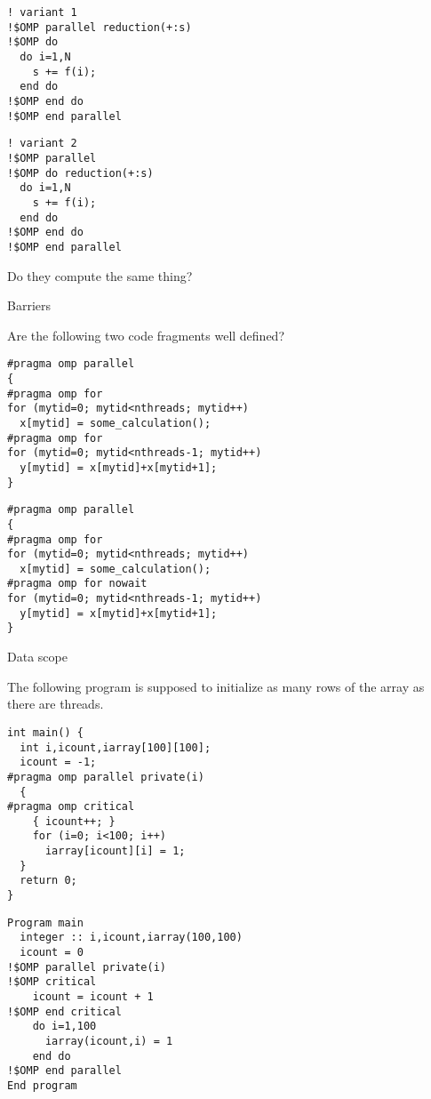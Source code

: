 \begin{multicols}{2}
\lstset{language=Fortran}
\begin{lstlisting}
! variant 1
!$OMP parallel reduction(+:s)
!$OMP do
  do i=1,N
    s += f(i);
  end do
!$OMP end do
!$OMP end parallel 
\end{lstlisting}
\columnbreak
\begin{lstlisting}
! variant 2
!$OMP parallel 
!$OMP do reduction(+:s)
  do i=1,N
    s += f(i);
  end do
!$OMP end do
!$OMP end parallel 
\end{lstlisting}
\end{multicols}

Do they compute the same thing?

\vfill\pagebreak

 {Barriers}

Are the following two code fragments well defined?
\begin{multicols}{2}
\lstset{language=C}
\begin{lstlisting}
#pragma omp parallel 
{
#pragma omp for
for (mytid=0; mytid<nthreads; mytid++)
  x[mytid] = some_calculation();
#pragma omp for
for (mytid=0; mytid<nthreads-1; mytid++)
  y[mytid] = x[mytid]+x[mytid+1];
}
\end{lstlisting}
\columnbreak
\begin{lstlisting}
#pragma omp parallel 
{
#pragma omp for
for (mytid=0; mytid<nthreads; mytid++)
  x[mytid] = some_calculation();
#pragma omp for nowait
for (mytid=0; mytid<nthreads-1; mytid++)
  y[mytid] = x[mytid]+x[mytid+1];
}
\end{lstlisting}
\end{multicols}

 {Data scope}

The following program is supposed to initialize as many
rows of the array as there are threads.

\begin{multicols}{2}
\small
\lstset{language=C}
\begin{lstlisting}
int main() {
  int i,icount,iarray[100][100];
  icount = -1;
#pragma omp parallel private(i)
  {
#pragma omp critical
    { icount++; }
    for (i=0; i<100; i++) 
      iarray[icount][i] = 1;
  }
  return 0;
}
\end{lstlisting}
\columnbreak
\lstset{language=Fortran}
\begin{lstlisting}
Program main
  integer :: i,icount,iarray(100,100)
  icount = 0
!$OMP parallel private(i)
!$OMP critical
    icount = icount + 1
!$OMP end critical
    do i=1,100
      iarray(icount,i) = 1
    end do
!$OMP end parallel
End program
\end{lstlisting}
\end{multicols}

